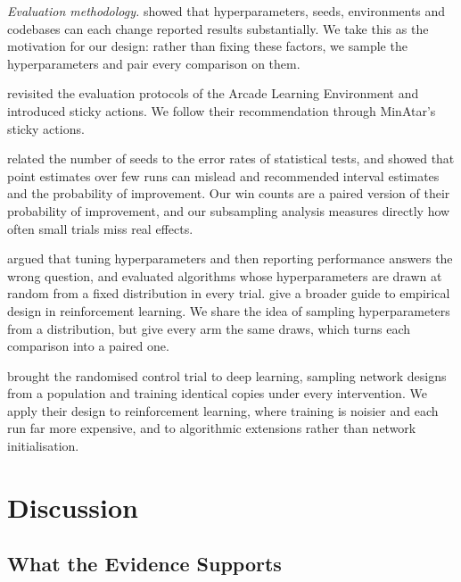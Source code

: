 \documentclass[conference,a4paper]{IEEEtran}
\begin{document}
\emph{Evaluation methodology.} \citet{henderson2018deep} showed that hyperparameters, seeds, environments and codebases
can each change reported results substantially. We take this as the motivation for our design: rather than fixing these
factors, we sample the hyperparameters and pair every comparison on them.

\citet{machado2018revisiting} revisited the evaluation protocols of the Arcade Learning Environment and introduced sticky
actions. We follow their recommendation through MinAtar's sticky actions.

\citet{colas2018many} related the number of seeds to the error rates of statistical tests, and \citet{agarwal2021deep}
showed that point estimates over few runs can mislead and recommended interval estimates and the probability of
improvement. Our win counts are a paired version of their probability of improvement, and our subsampling analysis
measures directly how often small trials miss real effects.

\citet{jordan2020evaluating} argued that tuning hyperparameters and then reporting performance answers the wrong
question, and evaluated algorithms whose hyperparameters are drawn at random from a fixed distribution in every trial.
\citet{patterson2024empirical} give a broader guide to empirical design in reinforcement learning. We share the idea of
sampling hyperparameters from a distribution, but give every arm the same draws, which turns each comparison into a
paired one.

\citet{pretorius2020dropout} brought the randomised control trial to deep learning, sampling network designs from a
population and training identical copies under every intervention. We apply their design to reinforcement learning,
where training is noisier and each run far more expensive, and to algorithmic extensions rather than network
initialisation.

\section{Discussion}\label{sec:discussion}

\subsection{What the Evidence Supports}\label{sec:evidence}
\end{document}
